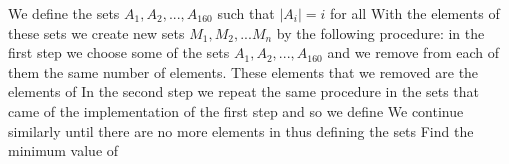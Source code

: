 We define the sets $A_1,A_2,...,A_{160}$ such that $\left|A_{i} \right|=i$ for all  With the elements of these sets we create new sets $M_1,M_2,...M_n$ by the following procedure: in the first step we choose some of the sets $A_1,A_2,...,A_{160}$ and we remove from each of them the same number of elements. These elements that we removed are the elements of  In the second step we repeat the same procedure in the sets that came of the implementation of the first step and so we define  We continue similarly until there are no more elements in  thus defining the sets  Find the minimum value of 